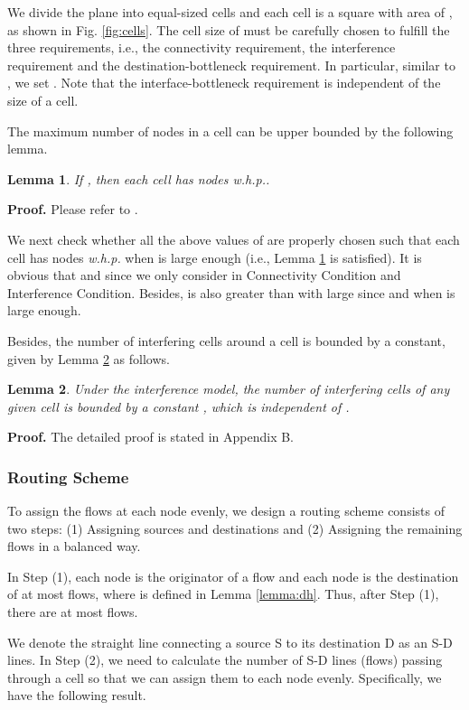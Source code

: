 \documentclass[10pt,journal]{IEEEtran}
\newtheorem{lemma}{Lemma}
\def\done{\hspace*{\fill} }
\begin{document}
We divide the plane into  equal-sized cells and each cell is a square with area of , as shown in Fig. \ref{fig:cells}. The cell size of  must be carefully chosen to fulfill the three requirements, i.e., the connectivity requirement, the interference requirement and the destination-bottleneck requirement. In particular, similar to \cite{Kyasanur:mobicom2005}, we set . Note that the interface-bottleneck requirement is independent of the size of a cell.

The maximum number of nodes in a cell can be upper bounded by the following lemma.
\begin{lemma}
\label{lemma:no_nodes}
If , then each cell has  nodes \textit{w.h.p.}.
\end{lemma}
\textbf{Proof.}
Please refer to \cite{Kyasanur:mobicom2005}.
\done

We next check whether all the above values of  are properly chosen such that each cell has  nodes \textit{w.h.p.} when  is large enough (i.e., Lemma \ref{lemma:no_nodes} is satisfied). It is obvious that  and  since we only consider  in Connectivity Condition and Interference Condition. Besides,  is also greater than  with large  since  and  when  is large enough.

Besides, the number of interfering cells around a cell is bounded by a constant, given by Lemma \ref{lemma:interfering_cells} as follows.
\begin{lemma}
\label{lemma:interfering_cells}
Under the interference model, the number of interfering cells of any given cell is bounded by a constant , which is independent of .
\end{lemma}
\textbf{Proof.} 
The detailed proof is stated in Appendix B. \done

\subsubsection{Routing Scheme}
\label{sec:routingscheme}
To assign the flows at each node evenly, we design a routing scheme consists of two steps: (1) Assigning sources and destinations and (2) Assigning the remaining flows in a balanced way.

In Step (1), each node is the originator of a flow and each node is the destination of at most  flows, where  is defined in Lemma \ref{lemma:dh}. Thus, after Step (1), there are at most  flows. 

We denote the straight line connecting a source S to its destination D as an S-D lines. In Step (2), we need to calculate the number of S-D lines (flows) passing through a cell so that we can assign them to each node evenly. Specifically, we have the following result.
\end{document}
